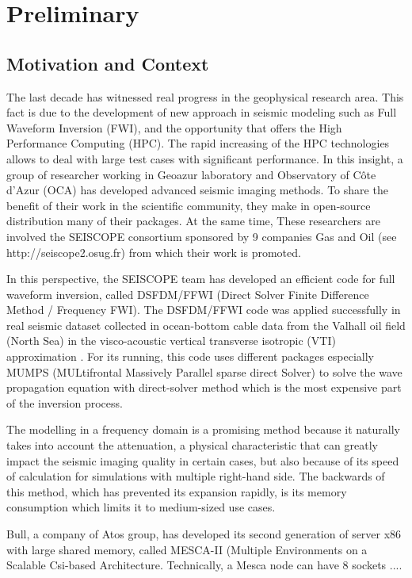 \chapter{Preliminary} 
\section{Motivation and Context}
The last decade has witnessed real progress in the geophysical research area. This fact is due to the development of new approach in seismic modeling such as Full Waveform Inversion (FWI), and the opportunity that offers the High Performance Computing (HPC). The rapid increasing of the HPC technologies allows to deal with large test cases with significant performance. In this insight, a group of researcher working in Geoazur laboratory and Observatory of C\^{o}te d'Azur (OCA) has developed advanced seismic imaging methods. To share the benefit of their work in the scientific community, they make in open-source distribution many of their packages. At the same time, These researchers are involved the SEISCOPE consortium sponsored by 9 companies Gas and Oil (see http://seiscope2.osug.fr) from which their work is promoted. 

In this perspective, the SEISCOPE team has developed an efficient code for full waveform inversion, called DSFDM/FFWI (Direct Solver Finite Difference Method / Frequency FWI). The DSFDM/FFWI code was applied successfully in real seismic dataset collected in ocean-bottom cable data from the Valhall oil field (North Sea) in the visco-acoustic vertical transverse isotropic (VTI) approximation \cite{}. For its running, this code uses different packages especially MUMPS (MULtifrontal Massively Parallel sparse direct Solver) to solve the wave propagation equation with direct-solver method which is the most expensive part of the inversion process. 

The modelling in a frequency domain is a promising method because it naturally takes into account the attenuation, a physical characteristic that can greatly impact the seismic imaging quality in certain cases,  but also because of its speed of calculation for simulations with multiple right-hand side. The backwards of this method, which has prevented its expansion rapidly, is its memory consumption which limits it to medium-sized use cases.

Bull, a company of Atos group, has developed its second generation of server x86 with large shared memory, called MESCA-II (Multiple Environments on a Scalable Csi-based Architecture. Technically, a Mesca node can have 8 sockets    
....

